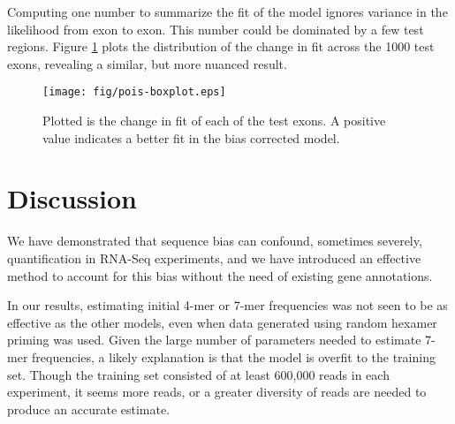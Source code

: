 \documentclass{bioinfo}
\begin{document}
\begin{comment}
\begin{tablehere}
\begin{center}
\tiny{
\begin{tabular}{lrrrrrr}
         &\textbf{Avg-7mer}&\textbf{7mer}&\textbf{4mer}&\textbf{GLM}&\textbf{MART}&\textbf{BN} \\
\textbf{Katze}            &  0.004  & 0.017  & 0.055 &0.166  &0.248&0.305 \\
\textbf{Wetterbom}        & -0.076  &-0.058  &-0.002 &0.240  &0.070&0.557 \\
\textbf{Bullard}          &  0.124  & 0.192  & 0.139 &0.285  &0.198&0.380 \\
\textbf{Mortazavi}        &  0.059  & 0.123  & 0.099 &0.284  &0.310&0.401 \\
\textbf{Trapnell}         &  0.094  & 0.163  & 0.104 &0.265  &0.332&0.349 \\
\end{tabular}
}
\end{center}
\caption{Change in fit, compared to the null model of uniform Poisson rate across exons.}
\label{tab:pois}
\end{tablehere}
\end{comment}

Computing one number to summarize the fit of the model ignores variance in the
likelihood from exon to exon. This number could be dominated by a few test
regions. Figure \ref{fig:pois} plots the distribution of the change in fit
across the 1000 test exons, revealing a similar, but more nuanced result.

\begin{figure}
\centerline{\texttt{[image: fig/pois-boxplot.eps]}}
\caption{Plotted is the change in fit of each of the test exons. A
positive value indicates a better fit in the bias corrected model.}
\label{fig:pois}
\end{figure}


\section{Discussion}

We have demonstrated that sequence bias can confound, sometimes severely,
quantification in RNA-Seq experiments, and we have introduced an effective
method to account for this bias without the need of existing gene annotations.

In our results, estimating initial 4-mer or 7-mer frequencies was not seen to be
as effective as the other models, even when data generated using random hexamer
priming was used. Given the large number of parameters needed to estimate 7-mer
frequencies, a likely explanation is that the model is overfit to the training
set. Though the training set consisted of at least 600,000 reads in
each experiment, it seems more reads, or a greater diversity of reads are needed
to produce an accurate estimate.
\end{document}
